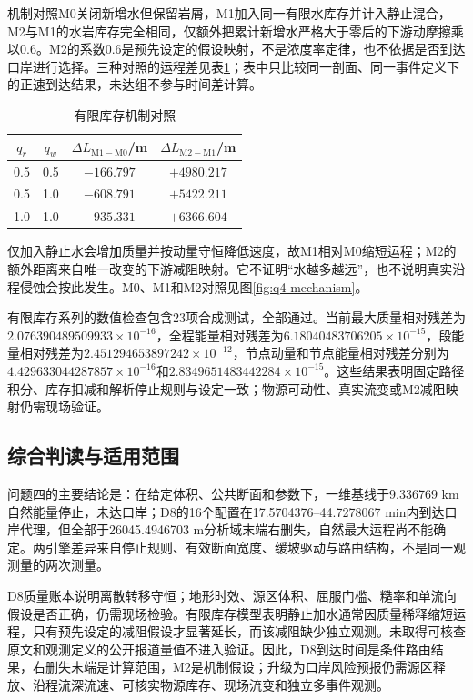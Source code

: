 机制对照M0关闭新增水但保留岩屑，M1加入同一有限水库存并计入静止混合，M2与M1的水岩库存完全相同，仅额外把累计新增水严格大于零后的下游动摩擦乘以0.6。M2的系数0.6是预先设定的假设映射，不是浓度率定律，也不依据是否到达口岸进行选择。三种对照的运程差见表\ref{tab:q4-inventory}；表中只比较同一剖面、同一事件定义下的正速到达结果，未达组不参与时间差计算。

\begin{table}[htbp]\centering\small
\caption{有限库存机制对照}\label{tab:q4-inventory}
\begin{tabular}{@{}c c c c@{}}
\toprule
$q_r$&$q_w$&$\Delta L_{\mathrm{M1-M0}}$/m&$\Delta L_{\mathrm{M2-M1}}$/m\\
\midrule
0.5&0.5&$-166.797$&$+4980.217$\\
0.5&1.0&$-608.791$&$+5422.211$\\
1.0&1.0&$-935.331$&$+6366.604$\\
\bottomrule
\end{tabular}
\end{table}

仅加入静止水会增加质量并按动量守恒降低速度，故M1相对M0缩短运程；M2的额外距离来自唯一改变的下游减阻映射。它不证明“水越多越远”，也不说明真实沿程侵蚀会按此发生。M0、M1和M2对照见图\ref{fig:q4-mechanism}。


有限库存系列的数值检查包含23项合成测试，全部通过。当前最大质量相对残差为$2.076390489509933\times10^{-16}$，全程能量相对残差为$6.18040483706205\times10^{-15}$，段能量相对残差为$2.451294653897242\times10^{-12}$，节点动量和节点能量相对残差分别为$4.429633044287857\times10^{-16}$和$2.8349651483442284\times10^{-15}$。这些结果表明固定路径积分、库存扣减和解析停止规则与设定一致；物源可动性、真实流变或M2减阻映射仍需现场验证。

\subsection{综合判读与适用范围}
问题四的主要结论是：在给定体积、公共断面和参数下，一维基线于9.336769 km自然能量停止，未达口岸；D8的16个配置在17.5704376--44.7278067 min内到达口岸代理，但全部于26045.4946703 m分析域末端右删失，自然最大运程尚不能确定。两引擎差异来自停止规则、有效断面宽度、缓坡驱动与路由结构，不是同一观测量的两次测量。

D8质量账本说明离散转移守恒；地形时效、源区体积、屈服门槛、糙率和单流向假设是否正确，仍需现场检验。有限库存模型表明静止加水通常因质量稀释缩短运程，只有预先设定的减阻假设才显著延长，而该减阻缺少独立观测。未取得可核查原文和观测定义的公开报道量值不进入验证。因此，D8到达时间是条件路由结果，右删失末端是计算范围，M2是机制假设；升级为口岸风险预报仍需源区释放、沿程流深流速、可核实物源库存、现场流变和独立多事件观测。
